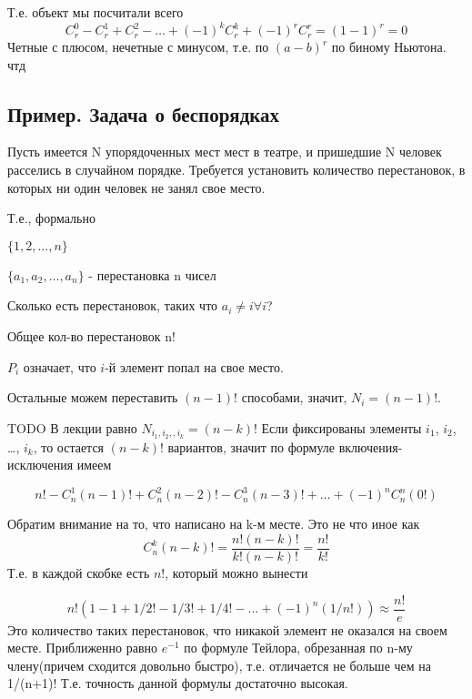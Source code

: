 
Т.е. объект мы посчитали всего 
$$
C_{r}^{0} - C_{r}^{1} + C_{r}^{2} -
 \ldots + (-1)^k C_{r}^{k} + (-1)^r C_{r}^{r} = (1 - 1)^r = 0
$$ 
Четные с плюсом, нечетные с минусом, т.е. по $(a-b)^r$ по биному Ньютона.
чтд

\subsection{Пример. Задача о беспорядках}

Пусть имеется N упорядоченных мест мест в театре, и пришедшие N человек расселись в случайном порядке.
Требуется установить количество перестановок, в которых ни один человек не занял свое место.

Т.е., формально

$\{1,2,\ldots, n \}$ 

$\{a_1,a_2,\ldots, a_n \}$ - перестановка n чисел

Сколько есть перестановок, таких что $a_i \neq i \forall i$?

Общее кол-во перестановок n!

$P_i$ означает, что $i$-й элемент попал на свое место.

Остальные можем переставить $(n-1)!$ способами, значит, $N_i=(n-1)!$.



TODO В лекции равно $N_{i_1, i_2, , i_k} = (n-k)!$
Если фиксированы элементы $i_1$, $i_2$, \dots, $i_k$, то остается $ (n-k)!$ вариантов,
значит по формуле включения-исключения имеем

$$
n! - C_{n}^{1} (n-1)! + C_{n}^{2} (n-2)! - C_{n}^{3} (n-3)! + \ldots + (-1)^n C_{n}^{n} (0!)
$$

Обратим внимание на то, что написано на k-м месте. Это не что иное как
$$
C_n^k(n-k)!= \frac{n!(n-k)!}{k!(n-k)!} = \frac{n!}{k!}
$$
Т.е. в каждой скобке есть $n!$, который можно вынести

$$
n! (1 - 1 + 1/2! -1/3! + 1/4! - ... + (-1)^n(1/n!)) \approx \frac{n!}{e}
$$
Это количество таких перестановок, что никакой элемент не оказался на своем месте.
Приближенно равно $e^{-1}$ по формуле Тейлора, обрезанная по n-му члену(причем сходится довольно быстро), т.е. отличается не больше чем на 1/(n+1)! Т.е. точность данной формулы достаточно высокая.


